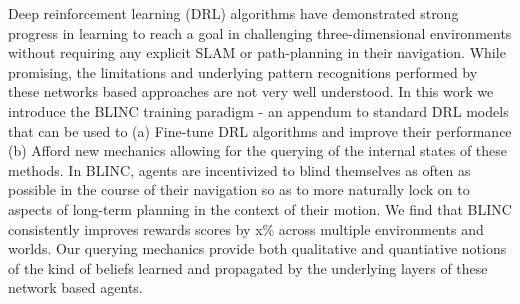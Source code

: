 Deep reinforcement learning (DRL) algorithms have demonstrated strong progress in learning to reach a goal in challenging three-dimensional environments without requiring any explicit SLAM or path-planning in their navigation. 
While promising, the limitations and underlying pattern recognitions performed by these networks based approaches are not very well understood. 
In this work we introduce the BLINC training paradigm - an appendum to standard DRL models that can be used to (a) Fine-tune DRL algorithms and improve their performance (b) Afford new mechanics allowing for the querying of the internal states of these methods. 
In BLINC, agents are incentivized to blind themselves as often as possible in the course of their navigation so as to more naturally lock on to aspects of long-term planning in the context of their motion. 
We find that BLINC consistently improves rewards scores by x\% across multiple environments and worlds. Our querying mechanics provide both qualitative and quantiative notions of the kind of beliefs learned and propagated by the underlying layers of these network based agents. 

